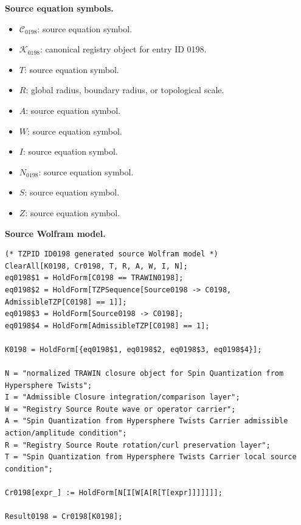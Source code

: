 \begin{minipage}[t]{0.49\linewidth}
\begingroup
\small
\raggedright
\textbf{Source equation symbols.}\par
\begin{itemize}[leftmargin=1.35em,itemsep=1pt,topsep=1pt,parsep=0pt]
    \item $\mathcal{C}_{0198}$: source equation symbol.
    \item $\mathcal{K}_{0198}$: canonical registry object for entry ID 0198.
    \item $T$: source equation symbol.
    \item $R$: global radius, boundary radius, or topological scale.
    \item $A$: source equation symbol.
    \item $W$: source equation symbol.
    \item $I$: source equation symbol.
    \item $N_{0198}$: source equation symbol.
    \item $S$: source equation symbol.
    \item $Z$: source equation symbol.
\end{itemize}
\endgroup
\end{minipage}\hfill
\begin{minipage}[t]{0.47\linewidth}
\begingroup
\scriptsize
\raggedright
\textbf{Source Wolfram model.}\par
\begin{Verbatim}[fontsize=\tiny,breaklines=true,breakanywhere=true]
(* TZPID ID0198 generated source Wolfram model *)
ClearAll[K0198, Cr0198, T, R, A, W, I, N];
eq0198$1 = HoldForm[C0198 == TRAWIN0198];
eq0198$2 = HoldForm[TZPSequence[Source0198 -> C0198, AdmissibleTZP[C0198] == 1]];
eq0198$3 = HoldForm[Source0198 -> C0198];
eq0198$4 = HoldForm[AdmissibleTZP[C0198] == 1];

K0198 = HoldForm[{eq0198$1, eq0198$2, eq0198$3, eq0198$4}];

N = "normalized TRAWIN closure object for Spin Quantization from Hypersphere Twists";
I = "Admissible Closure integration/comparison layer";
W = "Registry Source Route wave or operator carrier";
A = "Spin Quantization from Hypersphere Twists Carrier admissible action/amplitude condition";
R = "Registry Source Route rotation/curl preservation layer";
T = "Spin Quantization from Hypersphere Twists Carrier local source condition";

Cr0198[expr_] := HoldForm[N[I[W[A[R[T[expr]]]]]]];

Result0198 = Cr0198[K0198];
\end{Verbatim}
\endgroup
\end{minipage}

